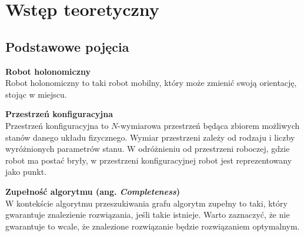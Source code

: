 \chapter{Wstęp teoretyczny}
\label{ch:theory}

\section{Podstawowe pojęcia}

\begin{definition}{\bf Robot holonomiczny\\}
	Robot holonomiczny to taki robot mobilny, który może zmienić swoją orientację, stojąc w miejscu.
\end{definition}

\vspace{0em}
\begin{definition}{\bf Przestrzeń konfiguracyjna\\}
	Przestrzeń konfiguracyjna to $N$-wymiarowa przestrzeń będąca zbiorem możliwych stanów danego układu fizycznego.
	Wymiar przestrzeni zależy od rodzaju i liczby wyróżnionych parametrów stanu.
	W odróżnieniu od przestrzeni roboczej, gdzie robot ma postać bryły, w przestrzeni konfiguracyjnej robot jest reprezentowany jako punkt.
\end{definition}

\vspace{0em}
\begin{definition}{\bf Zupełność algorytmu (ang. {\it Completeness})\\}
	W kontekście algorytmu przeszukiwania grafu algorytm zupełny to taki, który gwarantuje znalezienie rozwiązania, jeśli takie istnieje.
	Warto zaznaczyć, że nie gwarantuje to wcale, że znalezione rozwiązanie będzie rozwiązaniem optymalnym.
\end{definition}

